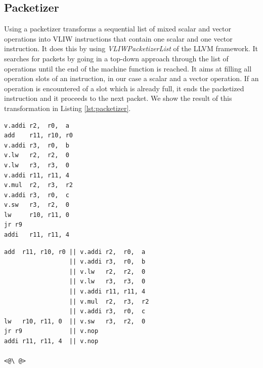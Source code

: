 \subsection{Packetizer}
Using a packetizer transforms a sequential list of mixed scalar and vector operations into VLIW instructions that contain one scalar and one vector instruction. It does this by using \emph{VLIWPacketizerList} of the LLVM framework. %
It searches for packets by going in a top-down approach through the list of operations until the end of the machine function is reached. It aims at filling all operation slots of an instruction, in our case a scalar and a vector operation. If an operation is encountered of a slot which is already full, it ends the packetized instruction and it proceeds to the next packet. 
We show the result of this transformation in Listing \ref{lst:packetizer}. 

\label{lst:packetizer}
\begin{center}
\hspace{2px}\begin{minipage}{.45\textwidth}
\begin{lstlisting}[frame=tlrb]
v.addi r2,  r0,  a
add    r11, r10, r0
v.addi r3,  r0,  b
v.lw   r2,  r2,  0
v.lw   r3,  r3,  0
v.addi r11, r11, 4
v.mul  r2,  r3,  r2
v.addi r3,  r0,  c
v.sw   r3,  r2,  0
lw     r10, r11, 0
jr r9
addi   r11, r11, 4
\end{lstlisting}
\end{minipage}\hfill
\begin{minipage}{.5\textwidth}
\begin{lstlisting}[frame=tlrb]
add  r11, r10, r0 || v.addi r2,  r0,  a
                  || v.addi r3,  r0,  b
                  || v.lw   r2,  r2,  0
                  || v.lw   r3,  r3,  0
                  || v.addi r11, r11, 4
                  || v.mul  r2,  r3,  r2
                  || v.addi r3,  r0,  c
lw   r10, r11, 0  || v.sw   r3,  r2,  0
jr r9             || v.nop
addi r11, r11, 4  || v.nop

<@\ @>
\end{lstlisting}
\end{minipage}
\end{center}


